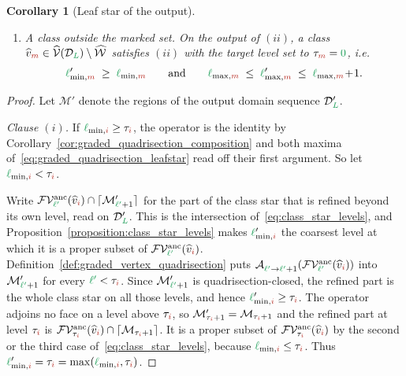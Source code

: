 \documentclass[a4paper, 12pt]{article}
\makeatletter
\newcommand{\lminIdx}[1]{\l_{\min,#1}}
\newcommand{\lmaxIdx}[1]{\l_{\max,#1}}
\newcommand{\targetlevel}{\tau}                                 %
\newcommand{\green}{\color{ForestGreen}}
\newcommand{\brickred}{\color{BrickRed}}
\newcommand{\V}{\mathcal{V}}
\newcommand{\F}{\mathcal{F}}
\newcommand{\vertexClass}[1]{\widehat{v}_{#1}}
\newcommand{\vertexClasses}{\widehat{\V}}
\DeclareRobustCommand{\markedVertexClasses}[1][]{\widehat{\mathcal{W}}\ifx\@empty#1\@empty\else^{#1}\fi}
\newcommand{\coarseIdxone}{{\brickred i}}
\newcommand{\coarseIdxtwo}{{\brickred m}}
\renewcommand{\l}{{\green\ell}}
\renewcommand{\L}{{\green L}}
\newcommand{\lzero}{{\green 0}}
\newcommand{\lone}{{\green {\l'}  }}
\newcommand{\Aop}[3]{\mathcal{A}^{#1}_{{#2} \to {#3}}}
\newcommand{\M}{\mathcal{M}}
\newtheorem{corollary}[theorem]{Corollary}
\theoremstyle{definition}
\theoremstyle{plain}
\numberwithin{equation}{section}
\newcommand{\ancestorPatch}[1]{\lceil #1 \rceil}
\DeclareRobustCommand{\domseq}[1][]{\mathcal{D}\ifx\@empty#1\@empty\else_{#1}\fi}
\newcommand{\FVanc}[1]{\F\V^{\mathrm{anc}}_{#1}}            %
\makeatother
\begin{document}
\begin{corollary}[Leaf star of the output]
\begin{enumerate}[topsep=3pt, itemsep=-2pt]
        \item[$(iii)$] \emph{A class outside the marked set.} On the output of $(ii)$, a class $\vertexClass{\coarseIdxtwo} \in \vertexClasses(\domseq[\L]) \setminus \markedVertexClasses$ satisfies $(ii)$ with the target level set to $\targetlevel_\coarseIdxtwo = \lzero$, i.e.
        \begin{equation}
            \label{eq:graded_quadrisection_leafstar_unmarked}
            \lminIdx{\coarseIdxtwo}' \; \geq \; \lminIdx{\coarseIdxtwo}
            \qquad \text{and} \qquad
            \lmaxIdx{\coarseIdxtwo} \; \leq \; \lmaxIdx{\coarseIdxtwo}' \; \leq \; \lmaxIdx{\coarseIdxtwo} \! + \! 1.
        \end{equation}
    \end{enumerate}
\end{corollary}
\begin{proof}
    Let $\M'$ denote the regions of the output domain sequence $\domseq[\L]'$.

    \emph{Clause $(i)$.} If $\lminIdx{\coarseIdxone} \geq \targetlevel_\coarseIdxone$, the operator is the identity by Corollary~\ref{cor:graded_quadrisection_composition} and both maxima of~\eqref{eq:graded_quadrisection_leafstar} read off their first argument. So let $\lminIdx{\coarseIdxone} < \targetlevel_\coarseIdxone$.

    Write $\FVanc{\lone}(\vertexClass{\coarseIdxone}) \cap \ancestorPatch{\M'_{\lone+1}}$ for the part of the class star that is refined beyond its own level, read on $\domseq[\L]'$. This is the intersection of~\eqref{eq:class_star_levels}, and Proposition~\ref{proposition:class_star_levels} makes $\lminIdx{\coarseIdxone}'$ the coarsest level at which it is a proper subset of $\FVanc{\lone}(\vertexClass{\coarseIdxone})$. Definition~\ref{def:graded_vertex_quadrisection} puts $\Aop{}{\lone}{\lone+1}(\FVanc{\lone}(\vertexClass{\coarseIdxone}))$ into $\M'_{\lone+1}$ for every $\lone < \targetlevel_\coarseIdxone$. Since $\M'_{\lone+1}$ is quadrisection-closed, the refined part is the whole class star on all those levels, and hence $\lminIdx{\coarseIdxone}' \geq \targetlevel_\coarseIdxone$. The operator adjoins no face on a level above $\targetlevel_\coarseIdxone$, so $\M'_{\targetlevel_\coarseIdxone+1} = \M_{\targetlevel_\coarseIdxone+1}$ and the refined part at level $\targetlevel_\coarseIdxone$ is $\FVanc{\targetlevel_\coarseIdxone}(\vertexClass{\coarseIdxone}) \cap \ancestorPatch{\M_{\targetlevel_\coarseIdxone+1}}$. It is a proper subset of $\FVanc{\targetlevel_\coarseIdxone}(\vertexClass{\coarseIdxone})$ by the second or the third case of~\eqref{eq:class_star_levels}, because $\lminIdx{\coarseIdxone} \leq \targetlevel_\coarseIdxone$. Thus $\lminIdx{\coarseIdxone}' = \targetlevel_\coarseIdxone = \max(\lminIdx{\coarseIdxone}, \targetlevel_\coarseIdxone)$.


\end{proof}
\end{document}
